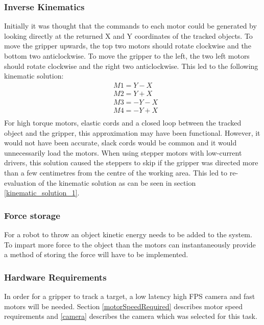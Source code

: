 \documentclass[conference]{IEEEtran}
\begin{document}
	\subsubsection{Inverse Kinematics}\label{initial_kinematics}
	Initially it was thought that the commands to each motor could be generated by looking directly at the returned X and Y coordinates of the tracked objects. To move the gripper upwards, the top two motors should rotate clockwise and the bottom two anticlockwise. To move the gripper to the left, the two left motors should rotate clockwise and the right two anticlockwise. This led to the following kinematic solution:
	\begin{equation}
	\begin{aligned}
	&M1 = Y - X \\
	&M2 = Y + X\\
	&M3 = -Y -X\\
	&M4 = -Y + X\\
	\end{aligned}
	\end{equation}
	For high torque motors, elastic cords and a closed loop between the tracked object and the gripper, this approximation may have been functional. However, it would not have been accurate, slack cords would be common and it would unnecessarily load the motors. When using stepper motors with low-current drivers, this solution caused the steppers to skip if the gripper was directed more than a few centimetres from the centre of the working area. 
	This led to re-evaluation of the kinematic solution as can be seen in section \ref{kinematic_solution_1}.
	
	\subsubsection{Force storage} \label{force_problem}
	For a robot to throw an object kinetic energy needs to be added to the system. To impart more force to the object than the motors can instantaneously provide a method of storing the force will have to be implemented.
	\subsubsection{Hardware Requirements}
		In order for a gripper to track a target, a low latency high FPS camera and fast motors will be needed. Section \ref{motorSpeedRequired} describes motor speed requirements and \ref{camera} describes the camera which was selected for this task.
\end{document}
